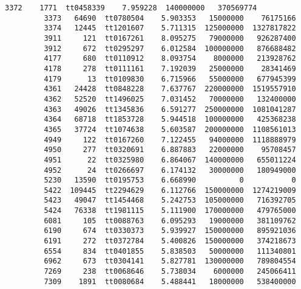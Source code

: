 \documentclass[11pt]{article}
\begin{document}
\begin{Verbatim}[commandchars=\\\{\}]
         3372    1771  tt0458339    7.959228  140000000   370569774   
         3373   64690  tt0780504    5.903353   15000000    76175166   
         3374   12445  tt1201607    5.711315  125000000  1327817822   
         3911     121  tt0167261    8.095275   79000000   926287400   
         3912     672  tt0295297    6.012584  100000000   876688482   
         4177     680  tt0110912    8.093754    8000000   213928762   
         4178     278  tt0111161    7.192039   25000000    28341469   
         4179      13  tt0109830    6.715966   55000000   677945399   
         4361   24428  tt0848228    7.637767  220000000  1519557910   
         4362   52520  tt1496025    7.031452   70000000   132400000   
         4363   49026  tt1345836    6.591277  250000000  1081041287   
         4364   68718  tt1853728    5.944518  100000000   425368238   
         4365   37724  tt1074638    5.603587  200000000  1108561013   
         4949     122  tt0167260    7.122455   94000000  1118888979   
         4950     277  tt0320691    6.887883   22000000    95708457   
         4951      22  tt0325980    6.864067  140000000   655011224   
         4952      24  tt0266697    6.174132   30000000   180949000   
         5230   13590  tt0195753    6.668990          0           0   
         5422  109445  tt2294629    6.112766  150000000  1274219009   
         5423   49047  tt1454468    5.242753  105000000   716392705   
         5424   76338  tt1981115    5.111900  170000000   479765000   
         6081     105  tt0088763    6.095293   19000000   381109762   
         6190     674  tt0330373    5.939927  150000000   895921036   
         6191     272  tt0372784    5.400826  150000000   374218673   
         6554     834  tt0401855    5.838503   50000000   111340801   
         6962     673  tt0304141    5.827781  130000000   789804554   
         7269     238  tt0068646    5.738034    6000000   245066411   
         7309    1891  tt0080684    5.488441   18000000   538400000   
         

\end{Verbatim}
\end{document}
